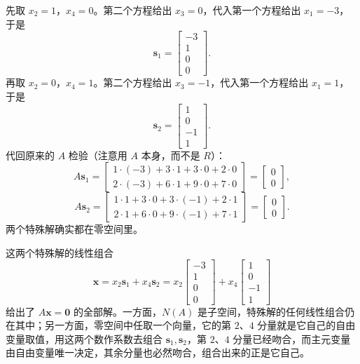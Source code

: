 \documentclass[UTF8,a4paper,12pt]{ctexart}
\numberwithin{equation}{section}
\begin{document}
	先取 $x_2=1$，$x_4=0$。第二个方程给出 $x_3=0$，代入第一个方程给出 $x_1=-3$，于是
	\begin{equation}\label{eq:5.24}
	\bm{s}_1=\begin{bmatrix}-3\\1\\0\\0\end{bmatrix}.
	\end{equation}
	再取 $x_2=0$，$x_4=1$。第二个方程给出 $x_3=-1$，代入第一个方程给出 $x_1=1$，于是
	\begin{equation}\label{eq:5.25}
	\bm{s}_2=\begin{bmatrix}1\\0\\-1\\1\end{bmatrix}.
	\end{equation}
	代回原来的 $A$ 检验（注意用 $A$ 本身，而不是 $R$）：
	\begin{equation}\label{eq:5.26}
	A\bm{s}_1=
	\begin{bmatrix}
		1\cdot(-3)+3\cdot1+3\cdot0+2\cdot0\\
		2\cdot(-3)+6\cdot1+9\cdot0+7\cdot0
	\end{bmatrix}
	=
	\begin{bmatrix}0\\0\end{bmatrix},
	\end{equation}
	\begin{equation}\label{eq:5.27}
	A\bm{s}_2=
	\begin{bmatrix}
		1\cdot1+3\cdot0+3\cdot(-1)+2\cdot1\\
		2\cdot1+6\cdot0+9\cdot(-1)+7\cdot1
	\end{bmatrix}
	=
	\begin{bmatrix}0\\0\end{bmatrix}.
	\end{equation}
	两个特殊解确实都在零空间里。
	
	这两个特殊解的线性组合
	\begin{equation}\label{eq:5.28}
	\bm{x}=x_2\bm{s}_1+x_4\bm{s}_2
	=x_2\begin{bmatrix}-3\\1\\0\\0\end{bmatrix}
	+x_4\begin{bmatrix}1\\0\\-1\\1\end{bmatrix}
	\end{equation}
	给出了 $A\bm{x}=\bm{0}$ 的全部解。一方面，$N(A)$ 是子空间，特殊解的任何线性组合仍在其中；另一方面，零空间中任取一个向量，它的第 $2$、$4$ 分量就是它自己的自由变量取值，用这两个数作系数去组合 $\bm{s}_1,\bm{s}_2$，第 $2$、$4$ 分量已经吻合，而主元变量由自由变量唯一决定，其余分量也必然吻合，组合出来的正是它自己。
	
\end{document}
